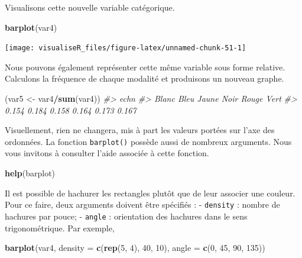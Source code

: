 \documentclass[]{article}
\newenvironment{Shaded}{\begin{snugshade}}{\end{snugshade}}
\newcommand{\CommentTok}[1]{\textcolor[rgb]{0.56,0.35,0.01}{\textit{#1}}}
\newcommand{\DataTypeTok}[1]{\textcolor[rgb]{0.13,0.29,0.53}{#1}}
\newcommand{\DecValTok}[1]{\textcolor[rgb]{0.00,0.00,0.81}{#1}}
\newcommand{\KeywordTok}[1]{\textcolor[rgb]{0.13,0.29,0.53}{\textbf{#1}}}
\newcommand{\NormalTok}[1]{#1}
\newcommand{\OperatorTok}[1]{\textcolor[rgb]{0.81,0.36,0.00}{\textbf{#1}}}
\newcommand{\StringTok}[1]{\textcolor[rgb]{0.31,0.60,0.02}{#1}}
\begin{document}
Visualisons cette nouvelle variable catégorique.

\begin{Shaded}
\begin{Highlighting}[]
\KeywordTok{barplot}\NormalTok{(var4)}
\end{Highlighting}
\end{Shaded}

\begin{center}\texttt{[image: visualiseR\_files/figure-latex/unnamed-chunk-51-1]} \end{center}

Nous pouvons également représenter cette même variable sous forme relative. Calculons la fréquence de chaque modalité et produisons un nouveau graphe.

\begin{Shaded}
\begin{Highlighting}[]
\NormalTok{(var5 <-}\StringTok{ }\NormalTok{var4}\OperatorTok{/}\KeywordTok{sum}\NormalTok{(var4))}
\CommentTok{#> echn}
\CommentTok{#> Blanc  Bleu Jaune  Noir Rouge  Vert }
\CommentTok{#> 0.154 0.184 0.158 0.164 0.173 0.167}
\end{Highlighting}
\end{Shaded}

Visuellement, rien ne changera, mis à part les valeurs portées sur l'axe des ordonnées. La fonction \texttt{barplot()} possède aussi de nombreux arguments. Nous vous invitons à consulter l'aide associée à cette fonction.

\begin{Shaded}
\begin{Highlighting}[]
\KeywordTok{help}\NormalTok{(barplot)}
\end{Highlighting}
\end{Shaded}

Il est possible de hachurer les rectangles plutôt que de leur associer une couleur. Pour ce faire, deux arguments doivent être spécifiés :
- \texttt{density} : nombre de hachures par pouce;
- \texttt{angle} : orientation des hachures dans le sens trigonométrique.
Par exemple,

\begin{Shaded}
\begin{Highlighting}[]
\KeywordTok{barplot}\NormalTok{(var4, }\DataTypeTok{density =} \KeywordTok{c}\NormalTok{(}\KeywordTok{rep}\NormalTok{(}\DecValTok{5}\NormalTok{, }\DecValTok{4}\NormalTok{), }\DecValTok{40}\NormalTok{, }\DecValTok{10}\NormalTok{), }\DataTypeTok{angle =} \KeywordTok{c}\NormalTok{(}\DecValTok{0}\NormalTok{, }\DecValTok{45}\NormalTok{, }\DecValTok{90}\NormalTok{, }\DecValTok{135}\NormalTok{))}
\end{Highlighting}
\end{Shaded}
\end{document}

